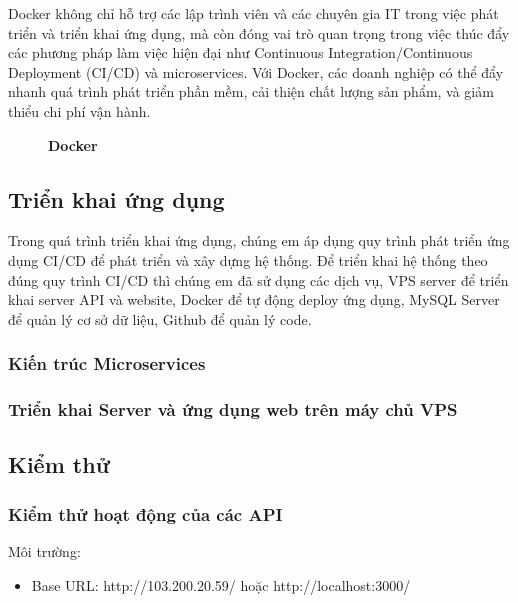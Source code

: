 Docker không chỉ hỗ trợ các lập trình viên và các chuyên gia IT trong việc phát triển và triển khai ứng dụng, mà còn đóng vai trò quan trọng trong việc thúc đẩy các phương pháp làm việc hiện đại như Continuous Integration/Continuous Deployment (CI/CD) và microservices. Với Docker, các doanh nghiệp có thể đẩy nhanh quá trình phát triển phần mềm, cải thiện chất lượng sản phẩm, và giảm thiểu chi phí vận hành.

\begin{figure}[H]
  \centering
  \caption[Docker]{\bfseries \fontsize{12pt}{0pt}
  \selectfont Docker}
  \label{docker} %
\end{figure}


\subsection{Triển khai ứng dụng}
Trong quá trình triển khai ứng dụng, chúng em áp dụng quy trình phát triển ứng dụng CI/CD để phát triển và xây dựng hệ thống. Để triển khai hệ thống theo đúng quy trình CI/CD thì chúng em đã sử dụng các dịch vụ, VPS server để triển khai server API và website, Docker để tự động deploy ứng dụng, MySQL Server để quản lý cơ sở dữ liệu, Github để quản lý code.


\subsubsection{Kiến trúc Microservices}

\subsubsection{Triển khai Server và ứng dụng web trên máy chủ VPS}
\subsection{Kiểm thử}

\subsubsection{Kiểm thử hoạt động của các API}


Môi trường: 

\begin{adjustwidth}{1.5em}{}
\begin{itemize}
  \item Base URL: http://103.200.20.59/ hoặc http://localhost:3000/
\end{itemize}
\end{adjustwidth}

